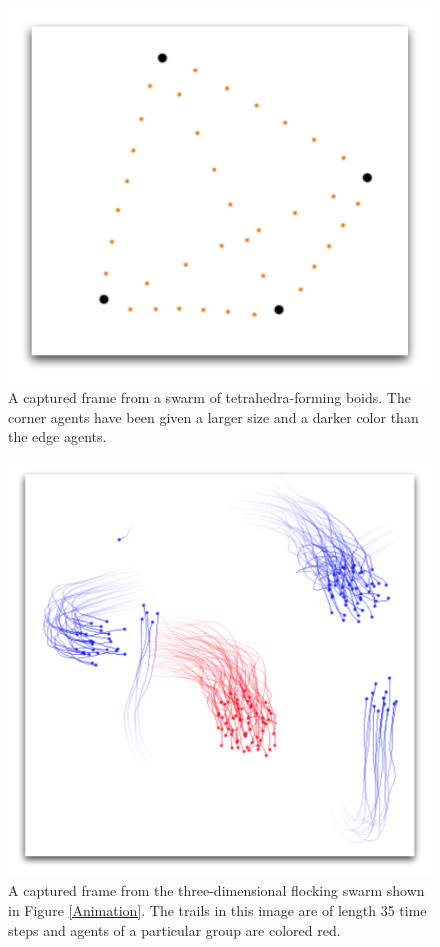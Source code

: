 \documentclass[conference]{IEEEtran}
\begin{document}
\begin{figure}
\centering
\includegraphics[scale=.4]{images/sizeandcolor.pdf}
\caption{
A captured frame from a swarm of tetrahedra-forming boids.
The corner agents have been given a larger size and a darker color than the edge agents.}
\label{SizeAndColor}
\end{figure}


\begin{figure}
\centering
\includegraphics[scale=.45]{images/flockcolor.pdf}
\caption{
A captured frame from the three-dimensional flocking swarm shown in Figure \ref{Animation}.
The trails in this image are of length 35 time steps and agents of a particular group are colored red.}
\label{FlockColor}
\end{figure}
\end{document}
